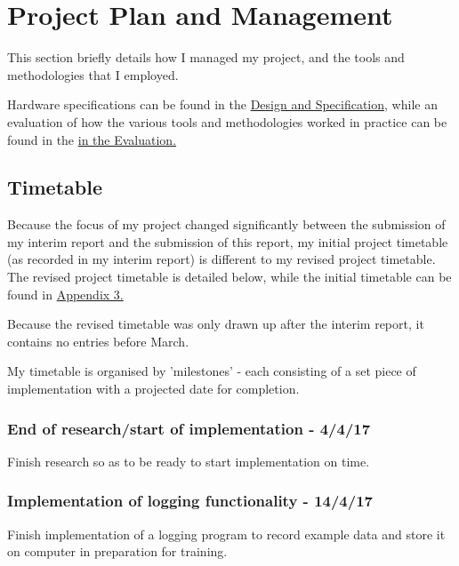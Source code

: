 \documentclass[a4paper]{article}
\begin{document}
\newpage
\section{Project Plan and Management}
\label{sec:pp}

This section briefly details how I managed my project, and the tools and methodologies that I employed. 

Hardware specifications can be found in the \hyperref[subsec:dc_hardware]{Design and Specification}, while an evaluation of how the various tools and methodologies worked in practice can be found in the \hyperref[subsec:ev_pm]{in the Evaluation.}

\subsection{Timetable}%
\label{subsec:pp_tt}

Because the focus of my project changed significantly between the submission of my interim report and the submission of this report, my initial project timetable (as recorded in my interim report) is different to my revised project timetable. The revised project timetable is detailed below, while the initial timetable can be found in \hyperref[subsec:a3_it]{Appendix 3.}

Because the revised timetable was only drawn up after the interim report, it contains no entries before March.

My timetable is organised by 'milestones' - each consisting of a set piece of implementation with a projected date for completion.

\subsubsection{End of research/start of implementation - 4/4/17}

Finish research so as to be ready to start implementation on time.

\subsubsection{Implementation of logging functionality - 14/4/17}

Finish implementation of a logging program to record example data and store it on computer in preparation for training.
\end{document}
